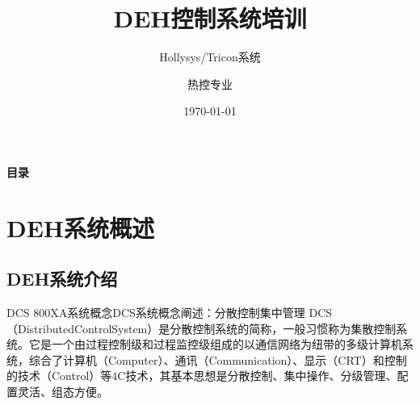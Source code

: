 \documentclass[12pt,hyperref={CJKbookmarks=true}]{beamer} %
\begin{document}
	
	\kaishu
	
	\title{DEH控制系统培训}
\subtitle{Hollysys/Tricon系统}
	\author{热控专业}
	\date{\today}
	\begin{frame}
		\titlepage
	\end{frame}
\begin{frame}{\textbf{目录}}
\tableofcontents
\end{frame}
	\section{DEH系统概述}
	\subsection{DEH系统介绍}
	\begin{frame}{DCS 800XA系统概念}{DCS系统概念阐述：分散控制集中管理}
		DCS（DistributedControlSystem）是分散控制系统的简称，一般习惯称为集散控制系统。它是一个由过程控制级和过程监控级组成的以通信网络为纽带的多级计算机系统，综合了计算机（Computer）、通讯（Communication）、显示（CRT）和控制的技术（Control）等4C技术，其基本思想是分散控制、集中操作、分级管理、配置灵活、组态方便。
	\end{frame}
\end{document}
